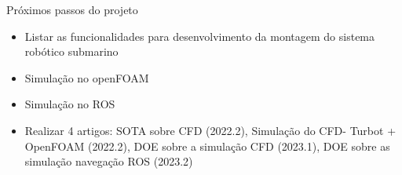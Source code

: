\begin{frame}[t]{Próximos passos do projeto}
    \begin{itemize}
        \item Listar as funcionalidades para desenvolvimento da montagem do sistema robótico submarino
        \item Simulação no openFOAM
        \item Simulação no ROS
        \item Realizar 4 artigos: SOTA sobre CFD (2022.2), Simulação do CFD- Turbot + OpenFOAM (2022.2), DOE sobre a simulação CFD (2023.1), DOE sobre as simulação navegação ROS (2023.2) 
        
    \end{itemize}    
\end{frame}


